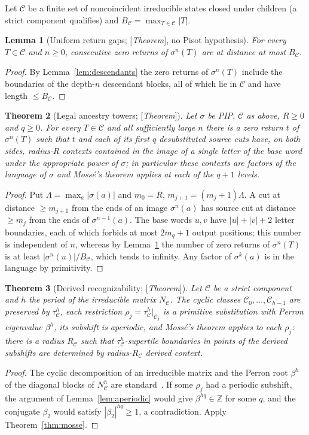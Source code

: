 \documentclass[11pt]{amsart}
\theoremstyle{plain}
\newtheorem{theorem}{Theorem}[section]
\newtheorem{lemma}[theorem]{Lemma}
\theoremstyle{definition}
\theoremstyle{remark}
\newcommand{\Z}{\mathbb{Z}}
\newcommand{\cC}{\mathcal{C}}
\newcommand{\Status}[1]{\textup{[\textit{#1}]}}
\begin{document}
Let $\cC$ be a finite set of noncoincident irreducible states closed under children (a strict component qualifies) and $B_\cC=\max_{T\in\cC}|T|$.

\begin{lemma}[Uniform return gaps; \Status{Theorem}, no Pisot hypothesis]\label{lem:return-gap}
For every $T\in\cC$ and $n\ge0$, consecutive zero returns of $\sigma^n(T)$ are at distance at most $B_\cC$.
\end{lemma}
\begin{proof}
By Lemma~\ref{lem:descendants} the zero returns of $\sigma^n(T)$ include the boundaries of the depth-$n$ descendant blocks, all of which lie in $\cC$ and have length $\le B_\cC$.
\end{proof}

\begin{theorem}[Legal ancestry towers; \Status{Theorem}]\label{thm:towers}
Let $\sigma$ be PIP, $\cC$ as above, $R\ge0$ and $q\ge0$. For every $T\in\cC$ and all sufficiently large $n$ there is a zero return $t$ of $\sigma^n(T)$ such that $t$ and each of its first $q$ desubstituted source cuts have, on both sides, radius-$R$ contexts contained in the image of a single letter of the base word under the appropriate power of $\sigma$; in particular these contexts are factors of the language of $\sigma$ and Moss\'e's theorem applies at each of the $q+1$ levels.
\end{theorem}
\begin{proof}
Put $\Lambda=\max_a|\sigma(a)|$ and $m_0=R$, $m_{j+1}=(m_j+1)\Lambda$. A cut at distance $\ge m_{j+1}$ from the ends of an image $\sigma^{n}(a)$ has source cut at distance $\ge m_j$ from the ends of $\sigma^{n-1}(a)$. The base words $u,v$ have $|u|+|v|+2$ letter boundaries, each of which forbids at most $2m_q+1$ output positions; this number is independent of $n$, whereas by Lemma~\ref{lem:return-gap} the number of zero returns of $\sigma^n(T)$ is at least $|\sigma^n(u)|/B_\cC$, which tends to infinity. Any factor of $\sigma^k(a)$ is in the language by primitivity.
\end{proof}

\begin{theorem}[Derived recognizability; \Status{Theorem}]\label{thm:derived-recog}
Let $\cC$ be a strict component and $h$ the period of the irreducible matrix $N_\cC$. The cyclic classes $\cC_0,\dots,\cC_{h-1}$ are preserved by $\tau_\cC^h$, each restriction $\rho_j=\tau_\cC^h|_{\cC_j}$ is a primitive substitution with Perron eigenvalue $\beta^h$, its subshift is aperiodic, and Moss\'e's theorem applies to each $\rho_j$: there is a radius $R_\cC$ such that $\tau_\cC^h$-supertile boundaries in points of the derived subshifts are determined by radius-$R_\cC$ derived context.
\end{theorem}
\begin{proof}
The cyclic decomposition of an irreducible matrix and the Perron root $\beta^h$ of the diagonal blocks of $N_\cC^h$ are standard~\cite{BermanPlemmons}. If some $\rho_j$ had a periodic subshift, the argument of Lemma~\ref{lem:aperiodic} would give $\beta^{hq}\in\Z$ for some $q$, and the conjugate $\beta_2$ would satisfy $|\beta_2|^{hq}\ge1$, a contradiction. Apply Theorem~\ref{thm:mosse}.
\end{proof}
\end{document}

